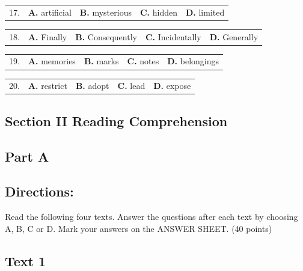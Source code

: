 \documentclass[UTF8,11pt]{ctexart}
\begin{document}
\noindent\begin{tabularx}{\linewidth}{@{}lXXXX@{}}17. & \textbf{A.} artificial & \textbf{B.} mysterious & \textbf{C.} hidden & \textbf{D.} limited\\\end{tabularx}\par

\noindent\begin{tabularx}{\linewidth}{@{}lXXXX@{}}18. & \textbf{A.} Finally & \textbf{B.} Consequently & \textbf{C.} Incidentally & \textbf{D.} Generally\\\end{tabularx}\par

\noindent\begin{tabularx}{\linewidth}{@{}lXXXX@{}}19. & \textbf{A.} memories & \textbf{B.} marks & \textbf{C.} notes & \textbf{D.} belongings\\\end{tabularx}\par

\noindent\begin{tabularx}{\linewidth}{@{}lXXXX@{}}20. & \textbf{A.} restrict & \textbf{B.} adopt & \textbf{C.} lead & \textbf{D.} expose\\\end{tabularx}\par

\subsection*{\textbf{Section II Reading Comprehension}}


\subsection*{\textbf{Part A}}


\subsection*{\textbf{Directions:}}


Read the following four texts. Answer the questions after each text by choosing A, B, C or D. Mark your answers on the ANSWER SHEET. (40 points)


\subsection*{\textbf{Text 1}}
\end{document}
